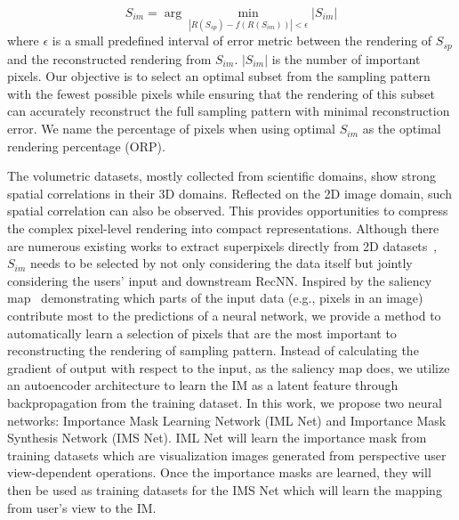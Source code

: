 \begin{equation}
S_{im} = \arg \min_{\left|R(S_{sp})-f(R(S_{im}))\right|<\epsilon}\left| S_{im}\right|
\end{equation}
where $\epsilon$ is a small predefined interval of error metric between the rendering of $S_{sp}$ and the reconstructed rendering from $S_{im}$. $\left| S_{im}\right|$ is the number of important pixels. Our objective is to select an optimal subset from the sampling pattern with the fewest possible pixels while ensuring that the rendering of this subset can accurately reconstruct the full sampling pattern with minimal reconstruction error. We name the percentage of pixels when using optimal $S_{im}$ as the optimal rendering percentage (ORP).

The volumetric datasets, mostly collected from scientific domains, show strong spatial correlations in their 3D domains. Reflected on the 2D image domain, such spatial correlation can also be observed. This provides opportunities to compress the complex pixel-level rendering into compact representations. Although there are numerous existing works to extract superpixels directly from 2D datasets~\cite{10.1145/3652509}, $S_{im}$ needs to be selected by not only considering the data itself but jointly considering the users' input and downstream RecNN. Inspired by the saliency map~\cite{6248093} demonstrating which parts of the input data (e.g., pixels in an image) contribute most to the predictions of a neural network, we provide a method to automatically learn a selection of pixels that are the most important to reconstructing the rendering of sampling pattern. Instead of calculating the gradient of output with respect to the input, as the saliency map does, we utilize an autoencoder architecture to learn the IM as a latent feature through backpropagation from the training dataset. In this work, we propose two neural networks: Importance Mask Learning Network (IML Net) and Importance Mask Synthesis Network (IMS Net). IML Net will learn the importance mask from training datasets which are visualization images generated from perspective user view-dependent operations. Once the importance masks are learned, they will then be used as training datasets for the IMS Net which will learn the mapping from user's view to the IM. 

